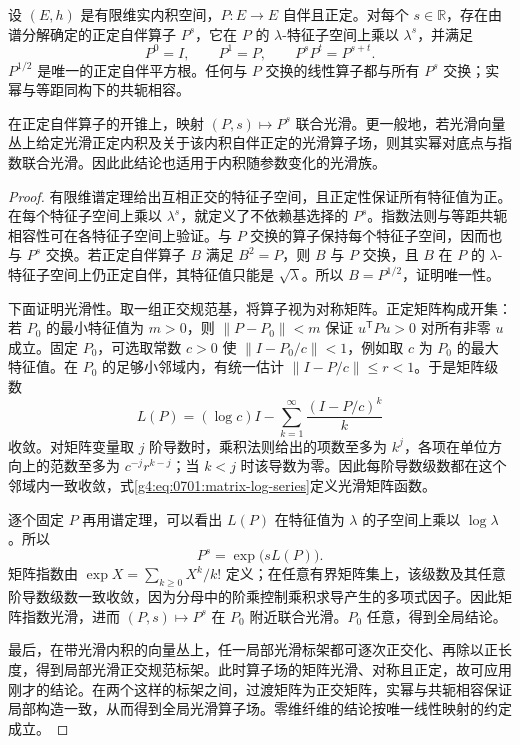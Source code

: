 \begin{lemma}\label{g4:lem:0701:positive-powers}
	设 \((E,h)\) 是有限维实内积空间，\(P:E\to E\) 自伴且正定。对每个 \(s\in\mathbb R\)，存在由谱分解确定的正定自伴算子 \(P^s\)，它在 \(P\) 的 \(\lambda\)-特征子空间上乘以 \(\lambda^s\)，并满足
	\[
		P^0=I,\qquad P^1=P,\qquad P^sP^t=P^{s+t}.
	\]
	\(P^{1/2}\) 是唯一的正定自伴平方根。任何与 \(P\) 交换的线性算子都与所有 \(P^s\) 交换；实幂与等距同构下的共轭相容。

	在正定自伴算子的开锥上，映射 \((P,s)\mapsto P^s\) 联合光滑。更一般地，若光滑向量丛上给定光滑正定内积及关于该内积自伴正定的光滑算子场，则其实幂对底点与指数联合光滑。因此此结论也适用于内积随参数变化的光滑族。
\end{lemma}
\begin{proof}
	有限维谱定理给出互相正交的特征子空间，且正定性保证所有特征值为正。在每个特征子空间上乘以 \(\lambda^s\)，就定义了不依赖基选择的 \(P^s\)。指数法则与等距共轭相容性可在各特征子空间上验证。与 \(P\) 交换的算子保持每个特征子空间，因而也与 \(P^s\) 交换。若正定自伴算子 \(B\) 满足 \(B^2=P\)，则 \(B\) 与 \(P\) 交换，且 \(B\) 在 \(P\) 的 \(\lambda\)-特征子空间上仍正定自伴，其特征值只能是 \(\sqrt\lambda\)。所以 \(B=P^{1/2}\)，证明唯一性。

	下面证明光滑性。取一组正交规范基，将算子视为对称矩阵。正定矩阵构成开集：若 \(P_0\) 的最小特征值为 \(m>0\)，则 \(\|P-P_0\|<m\) 保证 \(u^{\mathsf T}Pu>0\) 对所有非零 \(u\) 成立。固定 \(P_0\)，可选取常数 \(c>0\) 使 \(\|I-P_0/c\|<1\)，例如取 \(c\) 为 \(P_0\) 的最大特征值。在 \(P_0\) 的足够小邻域内，有统一估计 \(\|I-P/c\|\le r<1\)。于是矩阵级数
	\begin{equation}\label{g4:eq:0701:matrix-log-series}
		L(P)=(\log c)I-\sum_{k=1}^\infty\frac{(I-P/c)^k}{k}
	\end{equation}
	收敛。对矩阵变量取 \(j\) 阶导数时，乘积法则给出的项数至多为 \(k^j\)，各项在单位方向上的范数至多为 \(c^{-j}r^{k-j}\)；当 \(k<j\) 时该导数为零。因此每阶导数级数都在这个邻域内一致收敛，式\eqref{g4:eq:0701:matrix-log-series}定义光滑矩阵函数。

	逐个固定 \(P\) 再用谱定理，可以看出 \(L(P)\) 在特征值为 \(\lambda\) 的子空间上乘以 \(\log\lambda\)。所以
	\[
		P^s=\exp\bigl(sL(P)\bigr).
	\]
	矩阵指数由 \(\exp X=\sum_{k\ge0}X^k/k!\) 定义；在任意有界矩阵集上，该级数及其任意阶导数级数一致收敛，因为分母中的阶乘控制乘积求导产生的多项式因子。因此矩阵指数光滑，进而 \((P,s)\mapsto P^s\) 在 \(P_0\) 附近联合光滑。\(P_0\) 任意，得到全局结论。

	最后，在带光滑内积的向量丛上，任一局部光滑标架都可逐次正交化、再除以正长度，得到局部光滑正交规范标架。此时算子场的矩阵光滑、对称且正定，故可应用刚才的结论。在两个这样的标架之间，过渡矩阵为正交矩阵，实幂与共轭相容保证局部构造一致，从而得到全局光滑算子场。零维纤维的结论按唯一线性映射的约定成立。
\end{proof}

